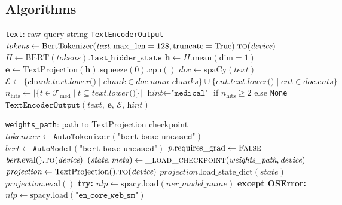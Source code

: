 \documentclass[12pt,a4paper]{article}
\theoremstyle{definition}
\theoremstyle{remark}
\begin{document}
\subsection{Algorithms}

\begin{algorithm}[H]
\caption{\texttt{TextEncoderV2.encode}(text)}
\label{alg:textencode}
\begin{algorithmic}[1]
\Require \texttt{text}: raw query string
\Ensure \texttt{TextEncoderOutput}
\State $\textit{tokens} \gets \text{BertTokenizer}(\textit{text},
       \text{max\_len}=128, \text{truncate}=\text{True}).\textsc{to}(\textit{device})$
\State $H \gets \text{BERT}(\textit{tokens}).\texttt{last\_hidden\_state}$
       \Comment{$[1, L, 768]$}
\State $\mathbf{h} \gets H.\text{mean}(\text{dim}=1)$
       \Comment{$[1, 768]$}
\State $\mathbf{e} \gets \text{TextProjection}(\mathbf{h}).\text{squeeze}(0).\text{cpu}()$
       \Comment{$[512]$}
\State $\textit{doc} \gets \text{spaCy}(\textit{text})$
\State $\mathcal{E} \gets \{\textit{chunk.text.lower()} \mid \textit{chunk} \in \textit{doc.noun\_chunks}\}
       \cup \{\textit{ent.text.lower()} \mid \textit{ent} \in \textit{doc.ents}\}$
\State $n_{\text{hits}} \gets |\{t \in \mathcal{T}_{\text{med}} \mid t \subseteq \textit{text.lower()}\}|$
\State $\textit{hint} \gets \texttt{"medical"}$ if $n_{\text{hits}} \geq 2$ else \texttt{None}
\State \Return $\texttt{TextEncoderOutput}(\textit{text},\, \mathbf{e},\, \mathcal{E},\, \textit{hint})$
\end{algorithmic}
\end{algorithm}

\begin{algorithm}[H]
\caption{\texttt{TextEncoderV2.load\_weights}(weights\_path)}
\label{alg:textload}
\begin{algorithmic}[1]
\Require \texttt{weights\_path}: path to TextProjection checkpoint
\State $\textit{tokenizer} \gets \texttt{AutoTokenizer}(\texttt{"bert-base-uncased"})$
\State $\textit{bert} \gets \texttt{AutoModel}(\texttt{"bert-base-uncased"})$
  \State $p.\text{requires\_grad} \gets \textsc{False}$
\EndFor
\State $\textit{bert}.\text{eval}().\textsc{to}(\textit{device})$
\State $(\textit{state}, \textit{meta}) \gets \textsc{\_load\_checkpoint}(\textit{weights\_path}, \textit{device})$
\State $\textit{projection} \gets \text{TextProjection}().\textsc{to}(\textit{device})$
\State $\textit{projection}.\text{load\_state\_dict}(\textit{state})$
\State $\textit{projection}.\text{eval}()$
\State \textbf{try:} $\textit{nlp} \gets \text{spacy.load}(\textit{ner\_model\_name})$
\State \textbf{except OSError:} $\textit{nlp} \gets \text{spacy.load}(\texttt{"en\_core\_web\_sm"})$
\end{algorithmic}
\end{algorithm}
\end{document}

